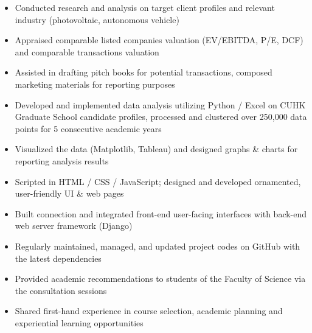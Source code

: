 \documentclass{resume}
\begin{document}
    \begin{itemize}
        \item Conducted research and analysis on target client profiles and relevant industry (photovoltaic, autonomous vehicle)
        \item Appraised comparable listed companies valuation (EV/EBITDA, P/E, DCF) and comparable transactions valuation
        \item Assisted in drafting pitch books for potential transactions, composed marketing materials for reporting purposes
    \end{itemize}
    \begin{itemize}
        \item Developed and implemented data analysis utilizing  Python / Excel on CUHK Graduate School candidate profiles, processed and clustered over 250,000 data points for 5 consecutive academic years
        \item Visualized the data (Matplotlib, Tableau) and designed graphs \& charts for reporting analysis results
    \end{itemize}
    \begin{itemize}
        \item Scripted in HTML / CSS / JavaScript; designed and developed ornamented, user-friendly UI \& web pages
        \item Built connection and integrated front-end user-facing interfaces with back-end web server framework (Django)
        \item Regularly maintained, managed, and updated project codes on GitHub with the latest dependencies
    \end{itemize}
    \begin{itemize}
        \item Provided academic recommendations to students of the Faculty of Science via the consultation sessions
        \item Shared first-hand experience in course selection, academic planning and experiential learning opportunities
    \end{itemize}
    
\end{document}
